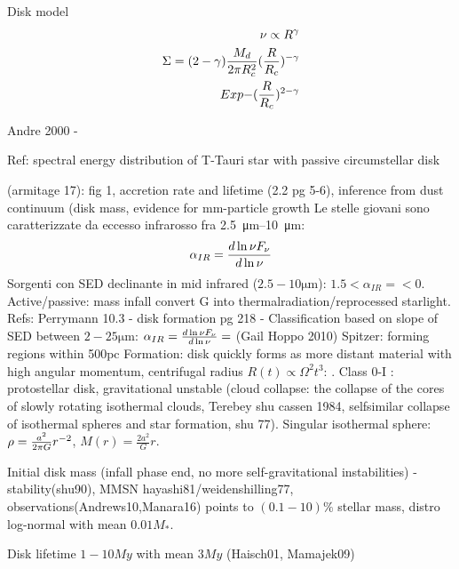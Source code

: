 \begin{workout}
Disk model
\begin{align}
\nu\propto R^{\gamma}\\
\Sigma=(2-\gamma)\frac{M_d}{2\pi R_c^2}(\frac{R}{R_c})^{-\gamma}\\Exp{-(\frac{R}{R_c})^{2-\gamma}}
\end{align}
\end{workout}


\begin{workout}
Andre 2000 - 
\end{workout}

\begin{workout}
Ref: spectral energy distribution of T-Tauri star with passive circumstellar disk
\end{workout}

\begin{workout}
(armitage 17): fig 1, accretion rate and lifetime (2.2 pg 5-6), inference from dust continuum (disk mass, evidence for mm-particle growth
Le stelle giovani sono caratterizzate da eccesso infrarosso fra \SIrange{2.5}{10}{\micro\meter}:
\begin{equation}
\alpha_{IR}=\frac{d \ln{\nu F_{\nu}}}{d \ln{\nu}}
\end{equation}
Sorgenti con SED declinante in mid infrared ($2.5-10\si{\micro\meter}$): $1.5<\alpha_{IR}=<0$. Active/passive: mass infall convert G into thermalradiation/reprocessed starlight.
Refs: Perrymann 10.3 - disk formation pg 218 - 
Classification based on slope of SED between $2-25\si{\micro\meter}$: $\alpha_{IR}=\frac{d \ln{\nu F_{\nu}}}{d \ln{\nu}}=$ (Gail Hoppo 2010)
Spitzer: forming regions within 500pc
Formation: disk quickly forms as more distant material with high angular momentum, centrifugal radius $R(t)\propto\Omega^2 t^3$: . Class 0-I : protostellar disk, gravitational unstable (cloud collapse: the collapse of the cores of slowly rotating isothermal clouds, Terebey shu cassen 1984, selfsimilar collapse of isothermal spheres and star formation, shu 77). Singular isothermal sphere: $\rho=\frac{a^2}{2\pi G}r^{-2}$, $M(r)=\frac{2a^2}{G}r$.
\end{workout}

\begin{workout}

Initial disk mass
(infall phase end, no more self-gravitational instabilities) - stability(shu90), MMSN hayashi81/weidenshilling77, observations(Andrews10,Manara16) points to $(0.1-10)\%$ stellar mass, distro log-normal with mean $0.01M_*$.

{Disk lifetime}
$1-10My$ with mean $3My$ (Haisch01, Mamajek09)

\end{workout}

